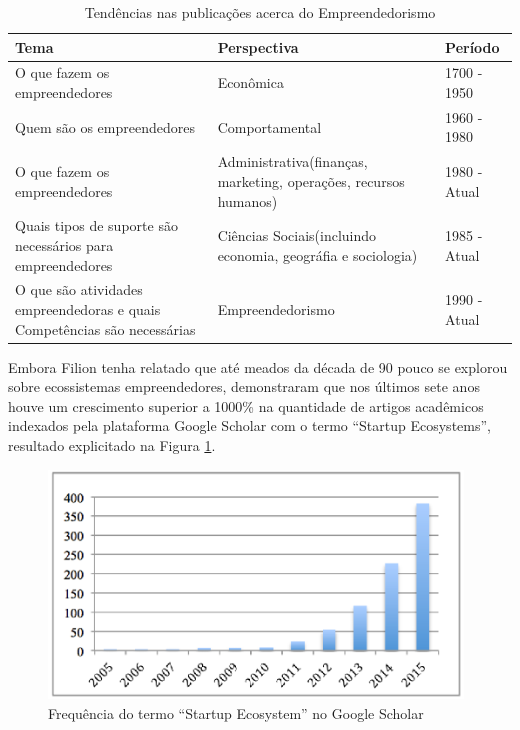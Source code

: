 \begin{table}[!htb]
	\centering
	\begin{tabular}{ | p{6cm} | p{6cm} | p{3cm} | }
		\hline
		\textbf{Tema} & \textbf{Perspectiva} & \textbf{Período} \\ \hline
		O que fazem os empreendedores & Econômica & 1700 - 1950 \\ \hline
		Quem são os empreendedores & Comportamental & 1960 - 1980 \\ \hline
		O que fazem os empreendedores & Administrativa(finanças, marketing, operações, recursos humanos) & 1980 - Atual \\ \hline
		Quais tipos de suporte são necessários para empreendedores & Ciências Sociais(incluindo economia, geográfia e sociologia) & 1985 - Atual \\ \hline
		O que são atividades empreendedoras e quais Competências são necessárias & Empreendedorismo & 1990 - Atual \\ \hline
	\end{tabular}
	\caption{Tendências nas publicações acerca do Empreendedorismo}
	\label{table:tendencias_nas_publicacoes_acerca_do_empreendedorismo}
\end{table}

Embora Filion tenha relatado que até meados da década de 90 pouco se explorou sobre ecossistemas empreendedores,   demonstraram que nos últimos sete anos houve um crescimento superior a 1000\% na quantidade de artigos acadêmicos indexados pela plataforma Google Scholar com o termo ``Startup Ecosystems'', resultado explicitado na Figura \ref{figure:papers_about_startup_ecosystems}.

\begin{figure}[!htb]
	\centering
	\includegraphics[width=11cm,angle=0]{figuras/papers_about_startup_ecosystems}
	\caption{Frequência do termo ``Startup Ecosystem'' no Google Scholar}
	\label{figure:papers_about_startup_ecosystems}
\end{figure}


